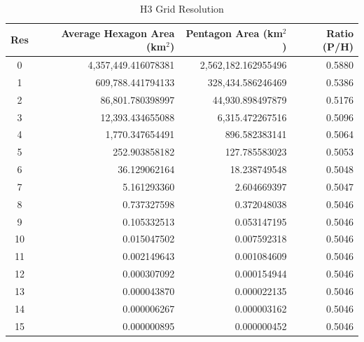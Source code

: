 \begin{table}[h]
\centering
\begin{tabular}{|c|r|r|r|}
\hline
\textbf{Res} & \textbf{Average Hexagon Area (km$^2$)} & \textbf{Pentagon Area (km$^2$)} & \textbf{Ratio (P/H)} \\
\hline
0 & 4,357,449.416078381 & 2,562,182.162955496 & 0.5880 \\
1 & 609,788.441794133 & 328,434.586246469 & 0.5386 \\
2 & 86,801.780398997 & 44,930.898497879 & 0.5176 \\
3 & 12,393.434655088 & 6,315.472267516 & 0.5096 \\
4 & 1,770.347654491 & 896.582383141 & 0.5064 \\
5 & 252.903858182 & 127.785583023 & 0.5053 \\
6 & 36.129062164 & 18.238749548 & 0.5048 \\
7 & 5.161293360 & 2.604669397 & 0.5047 \\
8 & 0.737327598 & 0.372048038 & 0.5046 \\
9 & 0.105332513 & 0.053147195 & 0.5046 \\
10 & 0.015047502 & 0.007592318 & 0.5046 \\
11 & 0.002149643 & 0.001084609 & 0.5046 \\
12 & 0.000307092 & 0.000154944 & 0.5046 \\
13 & 0.000043870 & 0.000022135 & 0.5046 \\
14 & 0.000006267 & 0.000003162 & 0.5046 \\
15 & 0.000000895 & 0.000000452 & 0.5046 \\
\hline
\end{tabular}
\caption{H3 Grid Resolution}
\label{tab:your_label_here}
\end{table}

